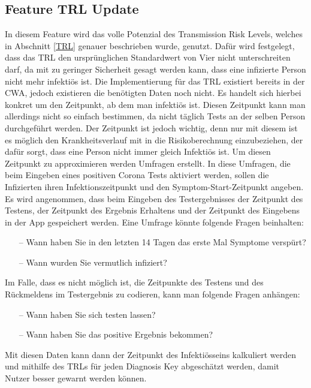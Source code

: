 \documentclass[conference,compsoc]{IEEEtran}
\begin{document}
\subsection{Feature TRL Update}
\label{Feature TRL Update}
In diesem Feature wird das volle Potenzial des Transmission Risk Levels, welches in Abschnitt \ref{TRL} genauer beschrieben wurde, genutzt. 
Dafür wird festgelegt, dass das TRL den ursprünglichen Standardwert von Vier nicht unterschreiten darf,
da mit zu geringer Sicherheit gesagt werden kann, dass eine infizierte Person nicht mehr infektiös ist. 
Die Implementierung für das TRL existiert bereits in der CWA, jedoch existieren die benötigten Daten noch nicht.
Es handelt sich hierbei konkret um den Zeitpunkt, ab dem man infektiös ist. 
Diesen Zeitpunkt kann man allerdings nicht so einfach bestimmen, da nicht täglich Tests an der selben Person durchgeführt werden.
Der Zeitpunkt ist jedoch wichtig, denn nur mit diesem ist es möglich den Krankheitsverlauf mit in die Risikoberechnung einzubeziehen,
der dafür sorgt, dass eine Person nicht immer gleich Infektiös ist. 
Um diesen Zeitpunkt zu approximieren werden Umfragen erstellt.  
In diese Umfragen, die beim Eingeben eines positiven Corona Tests aktiviert werden, sollen die Infizierten ihren Infektionszeitpunkt und den Symptom-Start-Zeitpunkt angeben. 
Es wird angenommen, dass beim Eingeben des Testergebnisses der Zeitpunkt des Testens, 
der Zeitpunkt des Ergebnis Erhaltens und der Zeitpunkt des Eingebens in der App gespeichert werden. 
Eine Umfrage könnte folgende Fragen beinhalten:

\begin{itemize}
	\item[--] Wann haben Sie in den letzten 14 Tagen das erste Mal Symptome verspürt?
	\item[--] Wann wurden Sie vermutlich infiziert?
\end{itemize}

Im Falle, dass es nicht möglich ist, die Zeitpunkte des Testens und des Rückmeldens im Testergebnis zu codieren, kann man folgende Fragen anhängen:

\begin{itemize}
	\item[--] Wann haben Sie sich testen lassen?
	\item[--] Wann haben Sie das positive Ergebnis bekommen?
\end{itemize} 
	
Mit diesen Daten kann dann der Zeitpunkt des Infektiösseins kalkuliert werden und mithilfe des TRLs für jeden Diagnosis Key abgeschätzt werden,
damit Nutzer besser gewarnt werden können.
\end{document}
